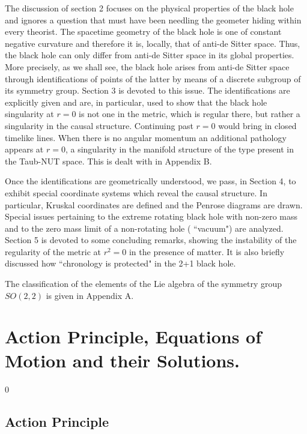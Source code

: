The discussion of section 2 focuses on the physical properties of
the black hole and ignores a question that must have been
needling the geometer hiding within every theorist. The
spacetime geometry of the black hole is one of constant negative
curvature and therefore it is, locally, that of anti-de Sitter
space. Thus, the black hole can only differ from anti-de Sitter
space in its global properties. More precisely, as we shall see, the
black hole arises from anti-de Sitter space through
identifications of points of the latter by means of a discrete
subgroup of its symmetry group\cite{4}.
Section 3 is devoted to this issue. The
identifications are explicitly given and are, in particular,
used to show that the black hole singularity at $r = 0$ is
not one in the metric, which is regular there, but rather a singularity in
the causal structure.  Continuing past $r = 0$ would bring in closed
timelike lines. When there is no angular momentum an additional
pathology appears at $r=0$, a singularity in the manifold
structure of the type present in the Taub-NUT space. This is
dealt with in Appendix B.


Once the identifications are geometrically understood, we pass,
in Section 4, to exhibit special coordinate systems which
reveal the causal structure. In particular, Kruskal coordinates are
defined and the Penrose diagrams are drawn. Special issues
pertaining to the extreme rotating black hole with non-zero mass
and to the zero mass limit of a non-rotating hole ( ``vacuum")
are analyzed. Section 5 is devoted to some concluding remarks, showing the
 instability of the regularity of the metric at $r^2 = 0$ in the presence of
 matter. It is also briefly discussed how ``chronology is protected" in
the 2+1 black hole.

The classification of the elements of the Lie algebra of the symmetry group
$SO(2,2)$ is given in Appendix A.



\section{Action Principle, Equations of Motion
\newline and their Solutions. }
\setcounter{equation} 0


\subsection{Action Principle}

